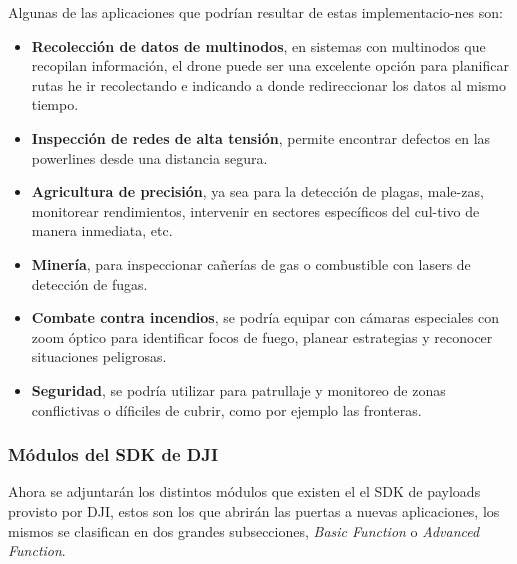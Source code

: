 \documentclass[12pt]{article}
\begin{document}
Algunas de las aplicaciones que podrían resultar de estas implementacio-nes son:
\begin{itemize}
  \item \textbf{Recolección de datos de multinodos}, en sistemas con multinodos que recopilan información, el drone puede ser una excelente opción para planificar rutas he ir recolectando e indicando a donde redireccionar los datos al mismo tiempo.
  \item \textbf{Inspección de redes de alta tensión}, permite encontrar defectos en las powerlines desde una distancia segura.
  \item \textbf{Agricultura de precisión}, ya sea para la detección de plagas, male-zas, monitorear rendimientos, intervenir en sectores específicos del cul-tivo de manera inmediata, etc.
  \item \textbf{Minería}, para inspeccionar cañerías de gas o combustible con lasers de detección de fugas.
  \item \textbf{Combate contra incendios}, se podría equipar con cámaras especiales con zoom óptico para identificar focos de fuego, planear estrategias y reconocer situaciones peligrosas.
  \item \textbf{Seguridad}, se podría utilizar para patrullaje y monitoreo de zonas conflictivas o díficiles de cubrir, como por ejemplo las fronteras.
\end{itemize}
\pagebreak 
\subsubsection{Módulos del SDK de DJI}
Ahora se adjuntarán los distintos módulos que existen el el SDK de payloads provisto por DJI, estos son los que abrirán las puertas a nuevas aplicaciones, los mismos se clasifican en dos grandes subsecciones, \textit{Basic Function} o \textit{Advanced Function}.
\end{document}
